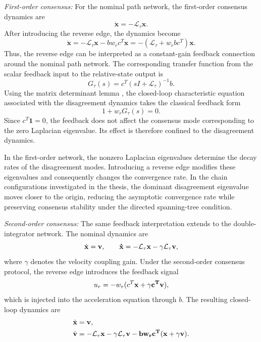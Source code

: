 \documentclass[11pt,a4paper]{article}
\begin{document}
\textit{First-order consensus:}
For the nominal path network, the first-order consensus dynamics are
\[
\boldsymbol{\dot{x}}=-\mathcal{L}_{\tau}\boldsymbol{x}.
\]
After introducing the reverse edge, the dynamics become
\begin{equation}
\boldsymbol{\dot{x}}
=-\mathcal{L}_{\tau}\boldsymbol{x}-bw_rc^T\boldsymbol{x}
=-\left(\mathcal{L}_{\tau}+w_rbc^T\right)\boldsymbol{x}.
\label{eq:reverse_edge_first_order}
\end{equation}
Thus, the reverse edge can be interpreted as a constant-gain feedback connection around the nominal path network. The corresponding transfer function from the scalar feedback input to the relative-state output is
\begin{equation}
G_{\tau}(s)=c^T(sI+\mathcal{L}_{\tau})^{-1}b.
\end{equation}
Using the matrix determinant lemma \cite{harville1997}, the closed-loop characteristic equation associated with the disagreement dynamics takes the classical feedback form
\begin{equation}
1+w_rG_{\tau}(s)=0.
\label{eq:reverse_edge_feedback_first_order}
\end{equation}
Since $c^T\mathbf{1}=0$, the feedback does not affect the consensus mode corresponding to the zero Laplacian eigenvalue. Its effect is therefore confined to the disagreement dynamics.

In the first-order network, the nonzero Laplacian eigenvalues determine the decay rates of the disagreement modes. Introducing a reverse edge modifies these eigenvalues and consequently changes the convergence rate. In the chain configurations investigated in the thesis, the dominant disagreement eigenvalue moves closer to the origin, reducing the asymptotic convergence rate while preserving consensus stability under the directed spanning-tree condition.

\textit{Second-order consensus:}
The same feedback interpretation extends to the double-integrator network. The nominal dynamics are
\begin{equation}
\dot{\bf{x}}=\bf{v},\qquad
\dot{\bf{x}}=-\mathcal{L}_{\tau}\bf{x}-\gamma \mathcal{L}_{\tau}\bf{v},
\end{equation}
where $\gamma$ denotes the velocity coupling gain. Under the second-order consensus protocol, the reverse edge introduces the feedback signal
\[
u_r=-w_r(c^T\bf{x}+\gamma c^T \bf{v}),
\]
which is injected into the acceleration equation through $b$. The resulting closed-loop dynamics are
\begin{equation}
\begin{aligned}
\dot{\bf{x}}&=\bf{v},\\
\dot{\bf{v}}&=-\mathcal{L}_{\tau}\bf{x}-\gamma \mathcal{L}_{\tau}\bf{v}
- bw_rc^T(x+\gamma \bf{v}).
\end{aligned}
\label{eq:reverse_edge_second_order}
\end{equation}
\end{document}
